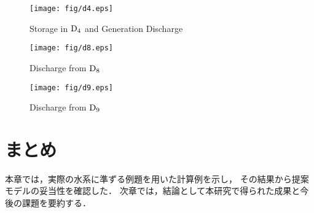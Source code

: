 \begin{figure}[H]
  \centering
  \texttt{[image: fig/d4.eps]}
  \caption{Storage in $\rm D_{4}$ and Generation Discharge }
  \label{fig:d4}
\end{figure}

\begin{figure}[H]
  \centering
  \texttt{[image: fig/d8.eps]}
  \caption{Discharge from $\rm D_{8}$}
  \label{fig:d8}
\end{figure}

\begin{figure}[H]
  \centering
  \texttt{[image: fig/d9.eps]}
  \caption{Discharge from $\rm D_{9}$}
  \label{fig:d9}
\end{figure}

\section{まとめ}

本章では，実際の水系に準ずる例題を用いた計算例を示し，%
その結果から提案モデルの妥当性を確認した．
次章では，結論として本研究で得られた成果と今後の課題を要約する．

